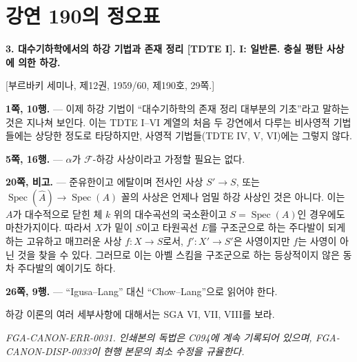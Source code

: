 \clearpage
\chapter*{강연 190의 정오표}
\setcounter{footnote}{0}

\noindent\textbf{3. 대수기하학에서의 하강 기법과 존재 정리
[TDTE I]. I: 일반론. 충실 평탄 사상에 의한 하강.}

\begin{center}
[부르바키 세미나, 제12권, 1959/60, 제190호, 29쪽.]
\end{center}

\noindent\textbf{1쪽, 10행.} --- 이제 하강 기법이 ``대수기하학의
존재 정리 대부분의 기초''라고 말하는 것은 지나쳐 보인다. 이는 TDTE
I--VI 계열의 처음 두 강연에서 다루는 비사영적 기법들에는 상당한
정도로 타당하지만, 사영적 기법들(TDTE IV, V, VI)에는 그렇지 않다.

\noindent\textbf{5쪽, 16행.} --- $\alpha$가 $\mathcal F$-하강 사상이라고
가정할 필요는 없다.

\noindent\textbf{20쪽, 비고.} --- 준유한이고 에탈이며 전사인 사상
$S'\longrightarrow S$, 또는
$\operatorname{Spec}(\widehat A)\longrightarrow\operatorname{Spec}(A)$
꼴의 사상은 언제나 엄밀 하강 사상인 것은 아니다. 이는 $A$가
대수적으로 닫힌 체 $k$ 위의 대수곡선의 국소환이고
$S=\operatorname{Spec}(A)$인 경우에도 마찬가지이다. 따라서 $X$가 밑이
$S$이고 타원곡선 $E$를 구조군으로 하는 주다발이 되게 하는 고유하고
매끄러운 사상 $f:X\longrightarrow S$로서,
$f':X'\longrightarrow S'$은 사영이지만 $f$는 사영이 아닌 것을 찾을
수 있다. 그러므로 이는 아벨 스킴을 구조군으로 하는 등상적이지 않은
동차 주다발의 예이기도 하다.

\noindent\textbf{26쪽, 9행.} --- ``Igusa--Lang'' 대신 ``Chow--Lang''으로
읽어야 한다.

하강 이론의 여러 세부사항에 대해서는 SGA VI, VII, VIII를 보라.

\par\smallskip
\begingroup\footnotesize
\noindent\textit{FGA-CANON-ERR-0031. 인쇄본의 독법은 C094에 계속 기록되어 있으며, FGA-CANON-DISP-0033이 현행 본문의 최소 수정을 규율한다.}\par
\endgroup
